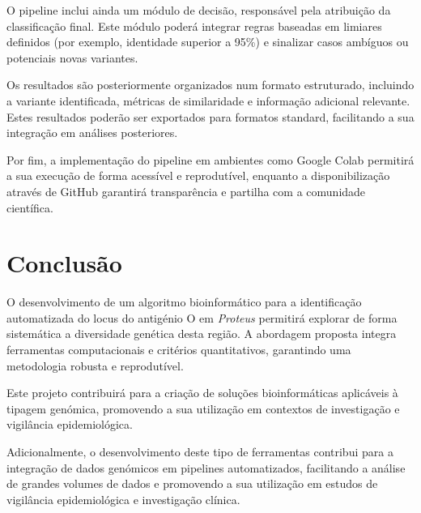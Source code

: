 \documentclass[a4paper,11pt]{article}
\begin{document}
O pipeline inclui ainda um módulo de decisão, responsável pela atribuição da classificação final. Este módulo poderá integrar regras baseadas em limiares definidos (por exemplo, identidade superior a 95\%) e sinalizar casos ambíguos ou potenciais novas variantes.

Os resultados são posteriormente organizados num formato estruturado, incluindo a variante identificada, métricas de similaridade e informação adicional relevante. Estes resultados poderão ser exportados para formatos standard, facilitando a sua integração em análises posteriores.

Por fim, a implementação do pipeline em ambientes como Google Colab permitirá a sua execução de forma acessível e reprodutível, enquanto a disponibilização através de GitHub garantirá transparência e partilha com a comunidade científica.

\section{Conclusão}

O desenvolvimento de um algoritmo bioinformático para a identificação automatizada do locus do antigénio O em \textit{Proteus} permitirá explorar de forma sistemática a diversidade genética desta região. A abordagem proposta integra ferramentas computacionais e critérios quantitativos, garantindo uma metodologia robusta e reprodutível.

Este projeto contribuirá para a criação de soluções bioinformáticas aplicáveis à tipagem genómica, promovendo a sua utilização em contextos de investigação e vigilância epidemiológica.

Adicionalmente, o desenvolvimento deste tipo de ferramentas contribui para a integração de dados genómicos em pipelines automatizados, facilitando a análise de grandes volumes de dados e promovendo a sua utilização em estudos de vigilância epidemiológica e investigação clínica.



\end{document}
